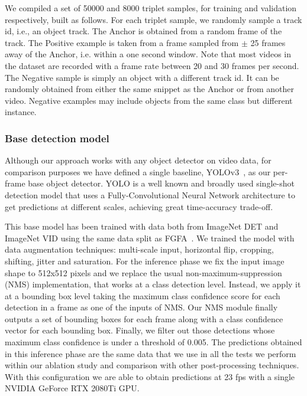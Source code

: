 \documentclass[letterpaper, 10 pt, conference]{ieeeconf}
\begin{document}
We compiled a set of 50000 and 8000 triplet samples, for training and validation respectively, built as follows. For each triplet sample, we randomly sample a track id, i.e., an object track. The Anchor is obtained from a random frame of the track.  The Positive example is taken from a frame sampled from $\pm$ 25 frames away of the Anchor, i.e. within a one second window. Note that most videos in the dataset are recorded with a frame rate between 20 and 30 frames per second. 
The Negative sample is simply an object with a different track id. It can be randomly obtained from either the same snippet as the Anchor or from another video. Negative examples may include objects from the same class but different instance. 

\subsubsection{Base detection model} 
\label{sec:base_det_model}



Although our approach works with any object detector on video data, for comparison purposes we have defined a single baseline, YOLOv3~\cite{redmon2018yolov3}, as our per-frame base object detector.
YOLO is a well known and broadly used single-shot detection model that uses a Fully-Convolutional Neural Network architecture to get predictions at different scales, achieving great time-accuracy trade-off.

This base model has been trained with data both from ImageNet DET and ImageNet VID using the same data split as FGFA~\cite{Zhu_2017_ICCV}. We trained the model with data augmentation techniques:  multi-scale input, horizontal flip, cropping, shifting, jitter and saturation. For the inference phase we fix the input image shape to 512x512 pixels and we replace the usual non-maximum-suppression (NMS) implementation, that works at a class detection level. Instead, we apply it at a bounding box level taking the maximum class confidence score for each detection in a frame as one of the inputs of NMS. Our NMS module finally outputs a set of bounding boxes for each frame along with a class confidence vector for each bounding box.
Finally, we filter out those detections whose maximum class confidence is under a threshold of 0.005. The predictions obtained in this inference phase are the same data that we use in all the tests we perform within our ablation study and comparison with other post-processing techniques. With this configuration we are able to obtain predictions at 23 fps with a single NVIDIA GeForce RTX 2080Ti GPU.
\end{document}
